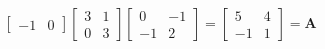 \documentclass[12pt,a4paper]{article}
\begin{document}
\begin{itemize}
\begin{itemize}
\begin{equation}
\begin{bmatrix}
        -1 & 0
      \end{bmatrix}
      \begin{bmatrix}
        3 & 1 \\
        0 & 3
      \end{bmatrix}
      \begin{bmatrix}
        0 & -1 \\
        -1 & 2
      \end{bmatrix}
      =
      \begin{bmatrix}
        5 & 4 \\
        -1 & 1
      \end{bmatrix}
      = \bm{A}
    \end{equation}

  \end{itemize}


\end{itemize}
\end{document}
